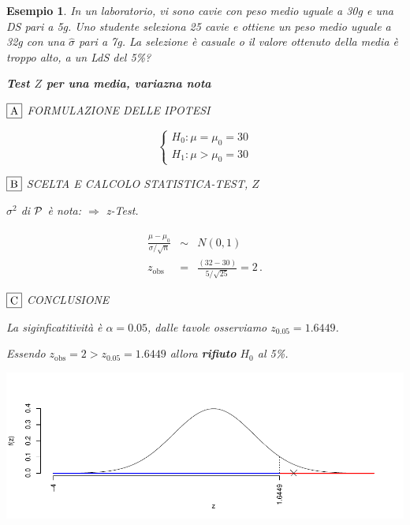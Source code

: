 \documentclass[
  11pt,
]{book}
\theoremstyle{mytheoremstyle}
\theoremstyle{mydefstyle}
\newtheorem{example}{{Esempio}}[section]
\begin{document}
\begin{example}

In un laboratorio, vi sono cavie con peso medio uguale a 30g e una DS
pari a 5g. Uno studente seleziona 25 cavie e ottiene un peso medio
uguale a 32g con una \(\hat\sigma\) pari a 7g. La selezione è casuale o il
valore ottenuto della media è troppo alto, a un LdS del 5\%?

\textbf{Test \(Z\) per una media, variazna nota}

\(\fbox{A}\) FORMULAZIONE DELLE IPOTESI

\[\begin{cases}
   H_0: \mu = \mu_0=30 \\
   H_1: \mu > \mu_0=30 
   \end{cases}\]

\(\fbox{B}\) SCELTA E CALCOLO STATISTICA-TEST, \(Z\)

\(\sigma^{2}\) di \(\cal{P}\) è nota: \(\Rightarrow\) z-Test.

\begin{eqnarray*}
   \frac{\hat\mu - \mu_{0}} {\sigma/\sqrt{n}}&\sim&N(0,1)\\
   z_{\text{obs}}
   &=& \frac{ ( 32 -  30 )} { 5 /\sqrt{ 25 }}
   =   2 \, .
   \end{eqnarray*}

\(\fbox{C}\) CONCLUSIONE

La siginficatitività è \(\alpha=0.05\), dalle tavole osserviamo \(z_{0.05}=1.6449\).

Essendo \(z_\text{obs}=2>z_{0.05}=1.6449\) allora \textbf{rifiuto} \(H_0\) al 5\%.

\begin{center}\includegraphics{Appunti_di_Statistica_2025_files/figure-latex/15-test-mu-pi-1,-1} \end{center}

\end{example}
\end{document}

